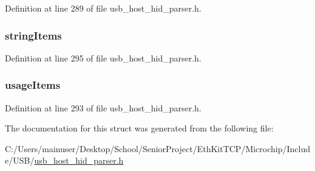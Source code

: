 Definition at line 289 of file usb\+\_\+host\+\_\+hid\+\_\+parser.\+h.

\hypertarget{struct___h_i_d___r_e_p_o_r_t_i_t_e_m_ab4ab301d12e4fda06883c464e55f2f46}{}
\subsubsection[{string\+Items}]{ string\+Items}\label{struct___h_i_d___r_e_p_o_r_t_i_t_e_m_ab4ab301d12e4fda06883c464e55f2f46}


Definition at line 295 of file usb\+\_\+host\+\_\+hid\+\_\+parser.\+h.

\hypertarget{struct___h_i_d___r_e_p_o_r_t_i_t_e_m_ae443eb226a165cd8e906d6135bf3c0e8}{}
\subsubsection[{usage\+Items}]{ usage\+Items}\label{struct___h_i_d___r_e_p_o_r_t_i_t_e_m_ae443eb226a165cd8e906d6135bf3c0e8}


Definition at line 293 of file usb\+\_\+host\+\_\+hid\+\_\+parser.\+h.



The documentation for this struct was generated from the following file\+:\begin{DoxyCompactItemize}
\item 
C\+:/\+Users/mainuser/\+Desktop/\+School/\+Senior\+Project/\+Eth\+Kit\+T\+C\+P/\+Microchip/\+Include/\+U\+S\+B/\hyperlink{usb__host__hid__parser_8h}{usb\+\_\+host\+\_\+hid\+\_\+parser.\+h}\end{DoxyCompactItemize}
